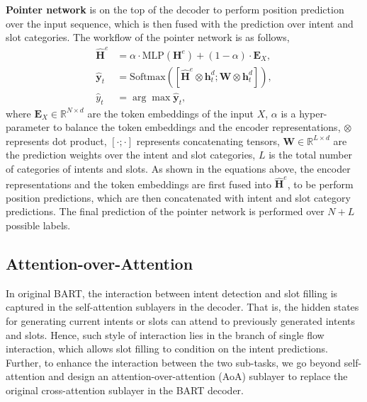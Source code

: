 \documentclass[11pt]{article}
\begin{document}
\textbf{Pointer network} is on the top of the decoder to perform position prediction over the input sequence, which is then fused with the prediction over intent and slot categories. The workflow of the pointer network is as follows,
\begin{align}
    \hat{\mathbf{H}}^e &= \alpha \cdot \text{MLP}(\mathbf{H}^e) + (1-\alpha)\cdot\mathbf{E}_X,\\
    \hat{\mathbf{y}}_t &= \text{Softmax}([\hat{\mathbf{H}}^e\otimes \mathbf{h}^d_t; \mathbf{W}\otimes \mathbf{h}^d_t]),\\
    \hat{y}_t &= \arg\max \hat{\mathbf{y}}_t,
\end{align}
where $\mathbf{E}_X\in\mathbb{R}^{N\times d}$ are the token embeddings of the input $X$, $\alpha$ is a hyper-parameter to balance the token embeddings and the encoder representations, $\otimes$ represents dot product, $[\cdot;\cdot]$ represents concatenating tensors, $\mathbf{W}\in\mathbb{R}^{L\times d}$ are the prediction weights over the intent and slot categories, $L$ is the total number of categories of intents and slots. As shown in the equations above, the encoder representations and the token embeddings are first fused into $\hat{\mathbf{H}}^e$, to be perform position predictions, which are then concatenated with intent and slot category predictions. The final prediction of the pointer network is performed over $N+L$ possible labels.

\subsection{Attention-over-Attention}
\label{subsec:aoa}
In original BART, the interaction between intent detection and slot filling is captured in the self-attention sublayers in the decoder. That is, the hidden states for generating current intents or slots can attend to previously generated intents and slots. Hence, such style of interaction lies in the branch of single flow interaction\cite{DBLP:conf/naacl/GooGHHCHC18,DBLP:conf/emnlp/QinCLWL19}, which allows slot filling to condition on the intent predictions. Further, to enhance the interaction between the two sub-tasks, we go beyond self-attention and design an attention-over-attention (AoA) sublayer to replace the original cross-attention sublayer in the BART decoder.
\end{document}
